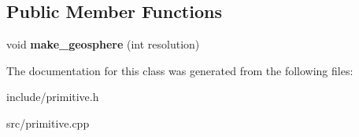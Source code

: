 \subsection*{Public Member Functions}
\begin{DoxyCompactItemize}
\item 
\mbox{\label{classgeosphere_ab78c5d35e8dae24a2c5916050746151f}} 
void {\bfseries make\+\_\+geosphere} (int resolution)
\end{DoxyCompactItemize}


The documentation for this class was generated from the following files\+:\begin{DoxyCompactItemize}
\item 
include/primitive.\+h\item 
src/primitive.\+cpp\end{DoxyCompactItemize}

